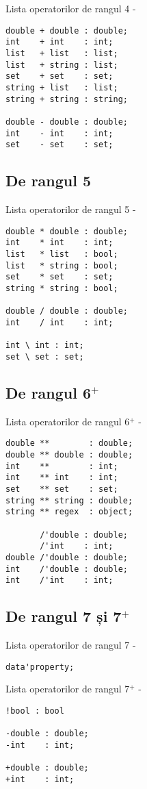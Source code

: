 \noindent Lista operatorilor de rangul 4 -
\begin{verbatim}
double + double : double;
int    + int    : int;
list   + list   : list;
list   + string : list;
set    + set    : set;
string + list   : list;
string + string : string;

double - double : double;
int    - int    : int;
set    - set    : set;
\end{verbatim}

\subsection{De rangul 5}

\noindent Lista operatorilor de rangul 5 -
\begin{verbatim}
double * double : double;
int    * int    : int;
list   * list   : bool;
list   * string : bool;
set    * set    : set;
string * string : bool;

double / double : double;
int    / int    : int;

int \ int : int;
set \ set : set;
\end{verbatim}

\subsection{De rangul 6$^+$}

\noindent Lista operatorilor de rangul 6$^+$ -
\begin{verbatim}
double **        : double;
double ** double : double;
int    **        : int;
int    ** int    : int;
set    ** set    : set;
string ** string : double;
string ** regex  : object;

       /'double : double;
       /'int    : int;
double /'double : double;
int    /'double : double;
int    /'int    : int;
\end{verbatim}

\subsection{De rangul 7 și 7$^+$}

\noindent Lista operatorilor de rangul 7 -
\begin{verbatim}
data'property;
\end{verbatim}

\noindent Lista operatorilor de rangul 7$^+$ -
\begin{verbatim}
!bool : bool

-double : double;
-int    : int;

+double : double;
+int    : int;
\end{verbatim}

